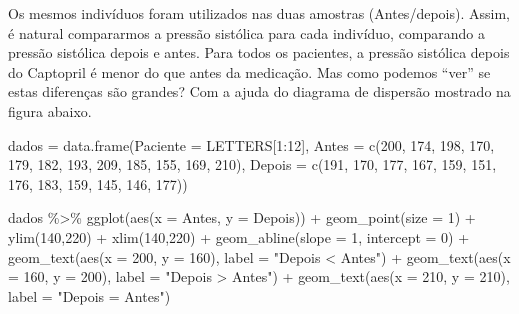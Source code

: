 \documentclass[
]{book}
\newenvironment{Shaded}{\begin{snugshade}}{\end{snugshade}}
\newcommand{\AttributeTok}[1]{\textcolor[rgb]{0.77,0.63,0.00}{#1}}
\newcommand{\DecValTok}[1]{\textcolor[rgb]{0.00,0.00,0.81}{#1}}
\newcommand{\FunctionTok}[1]{\textcolor[rgb]{0.00,0.00,0.00}{#1}}
\newcommand{\NormalTok}[1]{#1}
\newcommand{\OtherTok}[1]{\textcolor[rgb]{0.56,0.35,0.01}{#1}}
\newcommand{\SpecialCharTok}[1]{\textcolor[rgb]{0.00,0.00,0.00}{#1}}
\newcommand{\StringTok}[1]{\textcolor[rgb]{0.31,0.60,0.02}{#1}}
\begin{document}
Os mesmos indivíduos foram utilizados nas duas amostras (Antes/depois). Assim, é natural compararmos a pressão sistólica para cada indivíduo, comparando a pressão sistólica depois e antes. Para todos os pacientes, a pressão sistólica depois do Captopril é menor do que antes da medicação. Mas como podemos ``ver'' se estas diferenças são grandes? Com a ajuda do diagrama de dispersão mostrado na figura abaixo.

\begin{Shaded}
\begin{Highlighting}[]
\NormalTok{dados }\OtherTok{=} \FunctionTok{data.frame}\NormalTok{(}\AttributeTok{Paciente =}\NormalTok{ LETTERS[}\DecValTok{1}\SpecialCharTok{:}\DecValTok{12}\NormalTok{],}
                   \AttributeTok{Antes =} \FunctionTok{c}\NormalTok{(}\DecValTok{200}\NormalTok{, }\DecValTok{174}\NormalTok{, }\DecValTok{198}\NormalTok{, }\DecValTok{170}\NormalTok{, }\DecValTok{179}\NormalTok{, }\DecValTok{182}\NormalTok{, }\DecValTok{193}\NormalTok{, }\DecValTok{209}\NormalTok{, }\DecValTok{185}\NormalTok{, }\DecValTok{155}\NormalTok{, }\DecValTok{169}\NormalTok{, }\DecValTok{210}\NormalTok{),}
                   \AttributeTok{Depois =} \FunctionTok{c}\NormalTok{(}\DecValTok{191}\NormalTok{, }\DecValTok{170}\NormalTok{, }\DecValTok{177}\NormalTok{, }\DecValTok{167}\NormalTok{, }\DecValTok{159}\NormalTok{, }\DecValTok{151}\NormalTok{, }\DecValTok{176}\NormalTok{, }\DecValTok{183}\NormalTok{, }\DecValTok{159}\NormalTok{, }\DecValTok{145}\NormalTok{, }\DecValTok{146}\NormalTok{, }\DecValTok{177}\NormalTok{))}

\NormalTok{dados }\SpecialCharTok{\%\textgreater{}\%}
  \FunctionTok{ggplot}\NormalTok{(}\FunctionTok{aes}\NormalTok{(}\AttributeTok{x =}\NormalTok{ Antes, }\AttributeTok{y =}\NormalTok{ Depois)) }\SpecialCharTok{+}
  \FunctionTok{geom\_point}\NormalTok{(}\AttributeTok{size =} \DecValTok{1}\NormalTok{) }\SpecialCharTok{+}
  \FunctionTok{ylim}\NormalTok{(}\DecValTok{140}\NormalTok{,}\DecValTok{220}\NormalTok{) }\SpecialCharTok{+} \FunctionTok{xlim}\NormalTok{(}\DecValTok{140}\NormalTok{,}\DecValTok{220}\NormalTok{) }\SpecialCharTok{+}
  \FunctionTok{geom\_abline}\NormalTok{(}\AttributeTok{slope =} \DecValTok{1}\NormalTok{, }\AttributeTok{intercept =} \DecValTok{0}\NormalTok{) }\SpecialCharTok{+}
  \FunctionTok{geom\_text}\NormalTok{(}\FunctionTok{aes}\NormalTok{(}\AttributeTok{x =} \DecValTok{200}\NormalTok{, }\AttributeTok{y =} \DecValTok{160}\NormalTok{), }\AttributeTok{label =} \StringTok{"Depois \textless{} Antes"}\NormalTok{) }\SpecialCharTok{+}
  \FunctionTok{geom\_text}\NormalTok{(}\FunctionTok{aes}\NormalTok{(}\AttributeTok{x =} \DecValTok{160}\NormalTok{, }\AttributeTok{y =} \DecValTok{200}\NormalTok{), }\AttributeTok{label =} \StringTok{"Depois \textgreater{} Antes"}\NormalTok{) }\SpecialCharTok{+}
  \FunctionTok{geom\_text}\NormalTok{(}\FunctionTok{aes}\NormalTok{(}\AttributeTok{x =} \DecValTok{210}\NormalTok{, }\AttributeTok{y =} \DecValTok{210}\NormalTok{), }\AttributeTok{label =} \StringTok{"Depois = Antes"}\NormalTok{)}
\end{Highlighting}
\end{Shaded}
\end{document}
